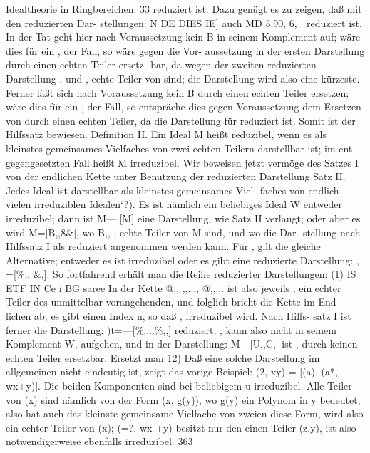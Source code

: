 \documentclass[11pt,a4paper]{article}
\theoremstyle{plain}
\theoremstyle{definition}
\begin{document}
Idealtheorie in Ringbereichen. 
33 
reduziert ist. 
Dazu genügt es zu zeigen, daß mit den reduzierten Dar- 
stellungen: 
N 
DE DIES IE] 
auch MD 5.90, 6, 
| 
reduziert ist. In der Tat geht hier nach Voraussetzung kein B in seinem 
Komplement auf; wäre dies für ein , der Fall, so wäre gegen die Vor- 
aussetzung in der ersten Darstellung  durch einen echten Teiler ersetz- 
bar, da wegen der zweiten reduzierten Darstellung , und , echte Teiler 
von  sind; 
die Darstellung wird 
also eine kürzeste. 
Ferner läßt sich 
nach Voraussetzung kein B durch einen echten Teiler ersetzen; wäre dies 
für ein , der Fall, so entspräche dies gegen Voraussetzung dem Ersetzen 
von  durch einen echten Teiler, da die Darstellung für  reduziert ist. 
Somit ist der Hilfssatz bewiesen. 
Definition II. 
Ein Ideal M heißt reduzibel, wenn es als kleinstes 
gemeinsames Vielfaches von zwei echten Teilern darstellbar ist; im ent- 
gegengesetzten Fall heißt M irreduzibel. 
Wir beweisen 
jetzt vermöge 
des Satzes I von 
der endlichen Kette 
unter Benutzung der reduzierten Darstellung 
Satz II. Jedes Ideal ist darstellbar als kleinstes gemeinsames Viel- 
faches von endlich vielen irreduziblen Idealen`?). 
Es ist nämlich 
ein beliebiges Ideal W entweder 
irreduzibel; 
dann 
ist M--- [M] eine Darstellung, wie Satz II verlangt; 
oder aber es wird 
M=[B,,8\&], 
wo B,, , echte Teiler von M sind, und wo 
die Dar- 
stellung nach Hilfssatz I als reduziert angenommen werden kann. 
Für 
, gilt die gleiche Alternative; 
entweder es 
ist irreduzibel oder es gibt 
eine reduzierte Darstellung: , =[\%,, \&,]. 
So fortfahrend erhält man die Reihe reduzierter Darstellungen: 
(1) 
IS 
ETF IN Ce i BG 
saree 
In der Kette @,, ,,..., @,,... ist also jeweils , ein echter Teiler 
des unmittelbar vorangehenden, und folglich bricht 
die Kette im End- 
lichen ab; es gibt einen Index n, so daß , irreduzibel wird. Nach Hilfs- 
satz I ist ferner die Darstellung: )t=---[\%,...\%,,] reduziert; , kann 
also nicht in seinem Komplement W, aufgehen, und in der Darstellung: 
M---[U,,C,] ist , durch keinen echten Teiler ersetzbar. 
Ersetzt man 
12) Daß eine solche Darstellung im allgemeinen nicht eindeutig ist, zeigt das vorige 
Beispiel: (2\textdegree{}, xy) = [(a), (a*, wx+y)]. Die beiden Komponenten sind bei beliebigem u 
irreduzibel. 
Alle Teiler von (x) sind nämlich von der Form (x, g(y)), wo g(y) ein 
Polynom in y bedeutet; also hat auch das kleinste gemeinsame Vielfache von zweien 
diese Form, wird also ein echter Teiler von (x); (=?, wx-+y) besitzt nur den einen Teiler 
(z,y), ist also notwendigerweise ebenfalls irreduzibel. 
363
\end{document}
